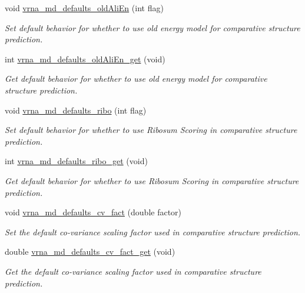 \begin{DoxyCompactItemize}
void \hyperlink{group__model__details_ga41521d5b9fb7e0f31e7ea73f5792afab}{vrna\+\_\+md\+\_\+defaults\+\_\+old\+Ali\+En} (int flag)
\begin{DoxyCompactList}\small\item\em Set default behavior for whether to use old energy model for comparative structure prediction. \end{DoxyCompactList}\item 
int \hyperlink{group__model__details_ga2374492b5019df88022fe4c05f0f3630}{vrna\+\_\+md\+\_\+defaults\+\_\+old\+Ali\+En\+\_\+get} (void)
\begin{DoxyCompactList}\small\item\em Get default behavior for whether to use old energy model for comparative structure prediction. \end{DoxyCompactList}\item 
void \hyperlink{group__model__details_ga937c45e1d06fd6168730a9b08d130be3}{vrna\+\_\+md\+\_\+defaults\+\_\+ribo} (int flag)
\begin{DoxyCompactList}\small\item\em Set default behavior for whether to use Ribosum Scoring in comparative structure prediction. \end{DoxyCompactList}\item 
int \hyperlink{group__model__details_ga169027f0c0561ea7d87b655e4b336bfc}{vrna\+\_\+md\+\_\+defaults\+\_\+ribo\+\_\+get} (void)
\begin{DoxyCompactList}\small\item\em Get default behavior for whether to use Ribosum Scoring in comparative structure prediction. \end{DoxyCompactList}\item 
void \hyperlink{group__model__details_gad3a3f40baafd91a6ce80a91a68e20053}{vrna\+\_\+md\+\_\+defaults\+\_\+cv\+\_\+fact} (double factor)
\begin{DoxyCompactList}\small\item\em Set the default co-\/variance scaling factor used in comparative structure prediction. \end{DoxyCompactList}\item 
double \hyperlink{group__model__details_gae59c68393807217b0a2497adb64d3ee3}{vrna\+\_\+md\+\_\+defaults\+\_\+cv\+\_\+fact\+\_\+get} (void)
\begin{DoxyCompactList}\small\item\em Get the default co-\/variance scaling factor used in comparative structure prediction. \end{DoxyCompactList}\item 

\end{DoxyCompactItemize}
